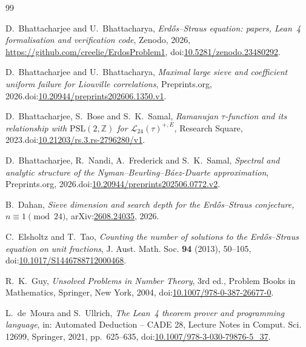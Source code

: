 \documentclass{amsart}
\theoremstyle{definition}
\theoremstyle{remark}
\numberwithin{equation}{section}
\newcommand{\repoURL}{https://github.com/creelie/ErdosProblem1}
\begin{document}
\begin{thebibliography}{99}
\raggedright

D.~Bhattacharjee and U.~Bhattacharya, \emph{Erd\H{o}s--Straus equation: papers, Lean~4 formalisation and verification code}, Zenodo, 2026, \url{\repoURL}, doi:\href{https://doi.org/10.5281/zenodo.23480292}{10.5281/zenodo.23480292}.

D.~Bhattacharjee and U.~Bhattacharya, \emph{Maximal large sieve and coefficient uniform failure for Liouville correlations}, Preprints.org, 2026.\newline doi:\href{https://doi.org/10.20944/preprints202606.1350.v1}{10.20944/preprints202606.1350.v1}.

D.~Bhattacharjee, S.~Bose and S.~K.~Samal, \emph{Ramanujan $\tau$-function and its relationship with $\mathrm{PSL}(2,\mathbb{Z})$ for $\mathcal{L}_{24}(\tau)^{+,E}$}, Research Square, 2023.\newline doi:\href{https://doi.org/10.21203/rs.3.rs-2796280/v1}{10.21203/rs.3.rs-2796280/v1}.

D.~Bhattacharjee, R.~Nandi, A.~Frederick and S.~K.~Samal, \emph{Spectral and analytic structure of the Nyman--Beurling--B\'aez-Duarte approximation}, Preprints.org, 2026.\newline doi:\href{https://doi.org/10.20944/preprints202506.0772.v2}{10.20944/preprints202506.0772.v2}.

B.~Dahan, \emph{Sieve dimension and search depth for the Erd\H{o}s--Straus conjecture, $n\equiv1\pmod{24}$}, arXiv:\href{https://arxiv.org/abs/2608.24035}{2608.24035}, 2026.

C.~Elsholtz and T.~Tao, \emph{Counting the number of solutions to the Erd\H{o}s--Straus equation on unit fractions}, J. Aust. Math. Soc. \textbf{94} (2013), 50--105, doi:\href{https://doi.org/10.1017/S1446788712000468}{10.1017/S1446788712000468}.

R.~K.~Guy, \emph{Unsolved Problems in Number Theory}, 3rd ed., Problem Books in Mathematics, Springer, New York, 2004, doi:\href{https://doi.org/10.1007/978-0-387-26677-0}{10.1007/978-0-387-26677-0}.

L.~de~Moura and S.~Ullrich, \emph{The Lean~4 theorem prover and programming language}, in: Automated Deduction -- CADE 28, Lecture Notes in Comput. Sci. 12699, Springer, 2021, pp.~625--635, doi:\href{https://doi.org/10.1007/978-3-030-79876-5_37}{10.1007/978-3-030-79876-5\_37}.


\end{thebibliography}
\end{document}
